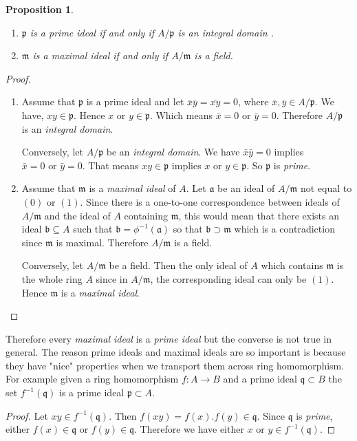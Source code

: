 \documentclass[]{report}
\newtheorem{prop}[theorem]{Proposition}
\newcommand\mfk[1]{\mathfrak{#1}}
\begin{document}
\begin{prop}
    \begin{enumerate}
        \item $\mathfrak{p}$ is a \textit{prime ideal} if and only if $A/\mathfrak{p}$ is an \textit{integral domain }. 
        \item $\mathfrak{m}$ is a \textit{maximal ideal} if and only if $A/\mathfrak{m}$ is a field.
    \end{enumerate}
\end{prop}
\begin{proof}
    \begin{enumerate}
        \item Assume that $\mfk{p}$ is a prime ideal and let $\bar{x} \bar{y} = \bar{xy} = 0$, where $\bar{x}, \bar{y} \in A/\mfk{p}$. We have, $xy \in \mfk{p}$. Hence $x \text{ or } y \in \mfk{p}$. Which means $\bar{x} = 0 \text{ or } \bar{y} = 0$. Therefore $A/\mfk{p}$ is an \textit{integral domain}.

            Conversely, let $A/\mfk{p}$ be an \textit{integral domain}. We have $\bar{x}\bar{y} = 0$ implies $\bar{x} = 0 \text{ or } \bar{y} = 0$. That means $xy \in \mfk{p}$ implies $x \text{ or } y \in \mfk{p}$. So $\mfk{p}$ is \textit{prime}.

        \item Assume that $\mfk{m}$ is a \textit{maximal ideal} of $A$. Let $\mfk{a}$ be an ideal of $A/\mfk{m}$ not equal to $(0) \text{ or } (1)$. Since there is a one-to-one correspondence between ideals of $A/\mfk{m}$ and the ideal of $A$ containing $\mfk{m}$, this would mean that there exists an ideal $\mfk{b} \subseteq A$ such that $\mfk{b} = \phi^{-1}(\mfk{a})$ so that $\mfk{b} \supset \mfk{m}$ which is a contradiction since $\mfk{m}$ is maximal. Therefore $A/\mfk{m}$ is a field.

            Conversely, let $A/\mfk{m}$ be a field. Then the only ideal of $A$ which contains $\mfk{m}$ is the whole ring $A$ since in $A/\mfk{m}$, the corresponding ideal can only be $(1)$. Hence $\mfk{m}$ is a \textit{maximal ideal}.
    \end{enumerate}
\end{proof}

Therefore every \textit{maximal ideal} is a \textit{prime ideal} but the converse is not true in general. The reason prime ideals and maximal ideals are so important is because they have "nice" properties when we transport them across ring homomorphism. For example given a ring homomorphism $f:A\rightarrow B$ and a prime ideal $\mathfrak{q}\subset B$ the set $f^{-1}(\mathfrak{q})$ is a prime ideal  $\mathfrak{p}\subset A$. 
\begin{proof}
    Let $xy \in f^{-1}(\mathfrak{q})$. Then $f(xy) = f(x).f(y) \in \mathfrak{q}$. Since $\mathfrak{q}$ is \textit{prime}, either $f(x) \in \mathfrak{q} \text{ or } f(y) \in \mathfrak{q}$. Therefore we have either $x \text{ or } y \in f^{-1}(\mathfrak{q})$.
\end{proof}
\end{document}
